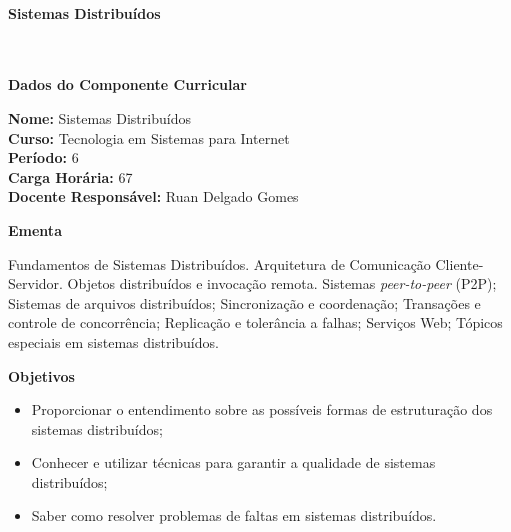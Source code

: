 \paragraph{Sistemas Distribu\'idos} \


\begin{snugshade}\begin{center}\textbf{
    Dados do Componente Curricular
}\end{center}\end{snugshade}

\noindent \textbf{Nome:}                Sistemas Distribu\'idos
\\        \textbf{Curso:}               Tecnologia em Sistemas para Internet
\\        \textbf{Período:}             \unit{6}{\degree}
\\        \textbf{Carga Horária:}       \unit{67}{\hour}
\\        \textbf{Docente Responsável:} Ruan Delgado Gomes


\begin{snugshade}\begin{center}\textbf{
    Ementa
\vphantom{q}}\end{center}\end{snugshade}

\noindent
Fundamentos de Sistemas Distribuídos. Arquitetura de Comunicação Cliente-Servidor. Objetos distribu\'idos e invoca\c{c}\~ao remota. Sistemas \textit{peer-to-peer} (P2P); Sistemas de arquivos distribuídos; Sincronização e coordena\c{c}\~ao; Transações e controle de concorr\^encia; Replicação e tolerância a falhas; Serviços Web; T\'opicos especiais em sistemas distribu\'idos.


\begin{snugshade}\begin{center}\textbf{
    Objetivos
}\end{center}\end{snugshade}

\begin{itemize}

\item Proporcionar o entendimento sobre as possíveis formas de estruturação dos sistemas distribuídos;

\item Conhecer e utilizar técnicas para garantir a qualidade de sistemas distribuídos;

\item Saber como resolver problemas de faltas em sistemas distribuídos.

\end{itemize} 


